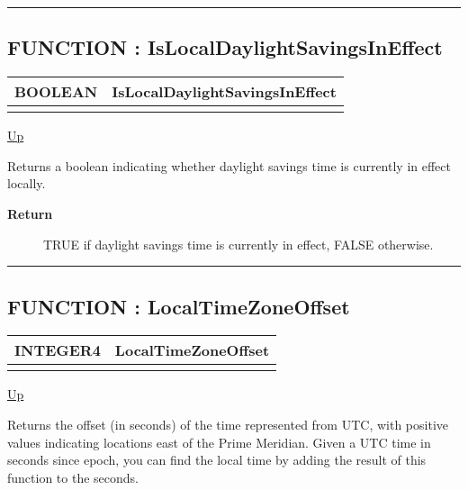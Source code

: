 \rule{\textwidth}{0.4pt}
\subsection*{FUNCTION : IsLocalDaylightSavingsInEffect}
\hypertarget{ecldoc:date.islocaldaylightsavingsineffect}{}

{\renewcommand{\arraystretch}{1.5}
\begin{tabularx}{\textwidth}{|>{\raggedright\arraybackslash}l|X|}
\hline
\hspace{0pt}BOOLEAN & IsLocalDaylightSavingsInEffect \\
\hline
\multicolumn{2}{|>{\raggedright\arraybackslash}X|}{\hspace{0pt}()} \\
\hline
\end{tabularx}
}

\hyperlink{ecldoc:Date}{Up}

\par
Returns a boolean indicating whether daylight savings time is currently in effect locally.

\par
\begin{description}
\item [\textbf{Return}] TRUE if daylight savings time is currently in effect, FALSE otherwise.
\end{description}

\rule{\textwidth}{0.4pt}
\subsection*{FUNCTION : LocalTimeZoneOffset}
\hypertarget{ecldoc:date.localtimezoneoffset}{}

{\renewcommand{\arraystretch}{1.5}
\begin{tabularx}{\textwidth}{|>{\raggedright\arraybackslash}l|X|}
\hline
\hspace{0pt}INTEGER4 & LocalTimeZoneOffset \\
\hline
\multicolumn{2}{|>{\raggedright\arraybackslash}X|}{\hspace{0pt}()} \\
\hline
\end{tabularx}
}

\hyperlink{ecldoc:Date}{Up}

\par
Returns the offset (in seconds) of the time represented from UTC, with positive values indicating locations east of the Prime Meridian. Given a UTC time in seconds since epoch, you can find the local time by adding the result of this function to the seconds.

